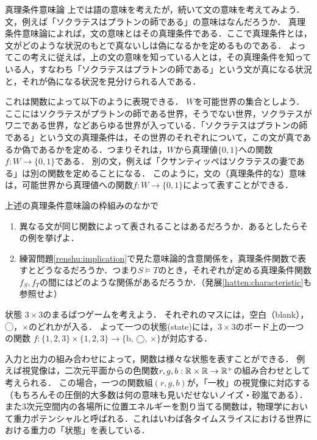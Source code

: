 \documentclass[dvipdfmx, 11pt,a4paper]{jsarticle}
\begin{document}
\begin{rei}{真理条件意味論}{}
上では語の意味を考えたが，続いて文の意味を考えてみよう．
文，例えば「ソクラテスはプラトンの師である」の意味はなんだろうか．
真理条件意味論によれば，文の意味とはその真理条件である．ここで真理条件とは，文がどのような状況のもとで真ないしは偽になるかを定めるものである．
よってこの考えに従えば，上の文の意味を知っている人とは，その真理条件を知っている人，すなわち「ソクラテスはプラトンの師である」という文が真になる状況と，それが偽になる状況を見分けられる人である．

これは関数によって以下のように表現できる．
$W$を可能世界の集合としよう．ここにはソクラテスがプラトンの師である世界，そうでない世界，ソクラテスがワニである世界，などあらゆる世界が入っている．「ソクラテスはプラトンの師である」という文の真理条件は，その世界のそれぞれについて，この文が真であるか偽であるかを定める．つまりそれは，$W$から真理値$\{ 0, 1 \}$への関数$f: W \to \{ 0, 1 \}$である．
別の文，例えば「クサンティッペはソクラテスの妻である」は別の関数を定めることになる．
このように，文の（真理条件的な）意味は，可能世界から真理値への関数$f: W \to \{ 0, 1 \}$によって表すことができる．
\end{rei}

\begin{renshu}{}{}
上述の真理条件意味論の枠組みのなかで
 \begin{enumerate}
  \item 異なる文が同じ関数によって表されることはあるだろうか．あるとしたらその例を挙げよ．
  \item 練習問題\ref{renshu:implication}で見た意味論的含意関係を，真理条件関数で表すとどうなるだろうか．つまり$S \vDash T$のとき，それぞれが定める真理条件関数$f_S, f_T$の間にはどのような関係があるだろうか．（発展\ref{hatten:characteristic}も参照せよ）
 \end{enumerate}
\end{renshu}


\begin{rei}{状態}{}
$3 \times 3$のまるばつゲームを考えよう．
それぞれのマスには，空白（blank），◯，×のどれかが入る．
よって一つの状態(state)には，$3 \times 3$のボード上の一つの関数 $f:\{1, 2, 3\} \times \{1, 2, 3\} \to \{ \text{b, ◯, ×}\}$が対応する．

入力と出力の組み合わせによって，関数は様々な状態を表すことができる．
例えば視覚像は，二次元平面からの色関数$r, g, b:\mathbb{R} \times \mathbb{R} \to \mathbb{R}^+$の組み合わせとして考えられる．
この場合，一つの関数組$(r,g,b)$が，「一枚」の視覚像に対応する（もちろんその圧倒的大多数は何の意味も見いだせないノイズ・砂嵐である）．
また3次元空間内の各場所に位置エネルギーを割り当てる関数は，物理学において重力ポテンシャルと呼ばれる．これはいわば各タイムスライスにおける世界における重力の「状態」を表している．
\end{rei}
\end{document}
